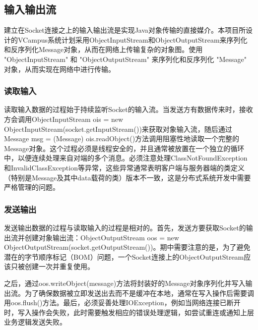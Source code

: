 \subsection{输入输出流}
建立在Socket连接之上的输入输出流是实现Java对象传输的直接媒介。本项目所设计的VCampus系统计划采用ObjectInputStream和ObjectOutputStream来序列化和反序列化Message对象，从而在网络上传输复杂的对象图。使用 "ObjectInputStream" 和 "ObjectOutputStream" 来序列化和反序列化 "Message" 对象，从而实现在网络中进行传输。
\subsubsection{读取输入}
读取输入数据的过程始于持续监听Socket的输入流。当发送方有数据传来时，接收方会调用ObjectInputStream ois = new ObjectInputStream(socket.getInputStream())来获取对象输入流，随后通过Message msg = (Message) ois.readObject()方法调用阻塞性地读取一个完整的Message对象。这个过程必须是线程安全的，并且通常被放置在一个独立的循环中，以便连续处理来自对端的多个消息。必须注意处理ClassNotFoundException和InvalidClassException等异常，这些异常通常表明客户端与服务器端的类定义（特别是Message及其中data载荷的类）版本不一致，这是分布式系统开发中需要严格管理的问题。
\subsubsection{发送输出}
发送输出数据的过程与读取输入的过程是相对的。首先，发送方要获取Socket的输出流并创建对象输出流：ObjectOutputStream oos = new ObjectOutputStream(socket.getOutputStream())。期中需要注意的是，为了避免潜在的字节顺序标记（BOM）问题，一个Socket连接上的ObjectOutputStream应该只被创建一次并重复使用。

之后，通过oos.writeObject(message)方法将封装好的Message对象序列化并写入输出流。为了确保数据被立即发送出去而不是缓冲在本地，通常在写入操作后需要调用oos.flush()方法。最后，必须妥善处理IOException，例如当网络连接已断开时，写入操作会失败，此时需要触发相应的错误处理逻辑，如尝试重连或通知上层业务逻辑发送失败。
